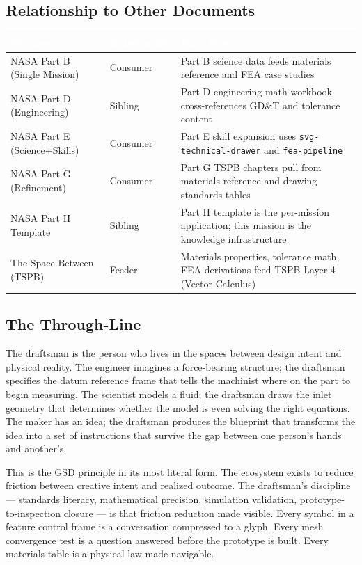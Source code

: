 \documentclass[11pt,letterpaper]{article}
\newcommand{\tableheader}[1]{\textbf{\sffamily\textcolor{white}{#1}}}
\begin{document}
\subsection{Relationship to Other Documents}

\begin{center}
\begin{tabularx}{\textwidth}{L{4cm}L{4cm}X}
\toprule
{}
\tableheader{Document} & \tableheader{Relationship} & \tableheader{Data Flow} \\
\midrule
NASA Part B (Single Mission) & Consumer & Part B science data feeds materials reference and FEA case studies \\
NASA Part D (Engineering) & Sibling & Part D engineering math workbook cross-references GD\&T and tolerance content \\
NASA Part E (Science+Skills) & Consumer & Part E skill expansion uses \texttt{svg-technical-drawer} and \texttt{fea-pipeline} \\
NASA Part G (Refinement) & Consumer & Part G TSPB chapters pull from materials reference and drawing standards tables \\
NASA Part H Template & Sibling & Part H template is the per-mission application; this mission is the knowledge infrastructure \\
The Space Between (TSPB) & Feeder & Materials properties, tolerance math, FEA derivations feed TSPB Layer 4 (Vector Calculus) \\
\bottomrule
\end{tabularx}
\end{center}

\subsection{The Through-Line}

The draftsman is the person who lives in the spaces between design intent and physical reality. The engineer imagines a force-bearing structure; the draftsman specifies the datum reference frame that tells the machinist where on the part to begin measuring. The scientist models a fluid; the draftsman draws the inlet geometry that determines whether the model is even solving the right equations. The maker has an idea; the draftsman produces the blueprint that transforms the idea into a set of instructions that survive the gap between one person's hands and another's.

This is the GSD principle in its most literal form. The ecosystem exists to reduce friction between creative intent and realized outcome. The draftsman's discipline --- standards literacy, mathematical precision, simulation validation, prototype-to-inspection closure --- is that friction reduction made visible. Every symbol in a feature control frame is a conversation compressed to a glyph. Every mesh convergence test is a question answered before the prototype is built. Every materials table is a physical law made navigable.
\end{document}
